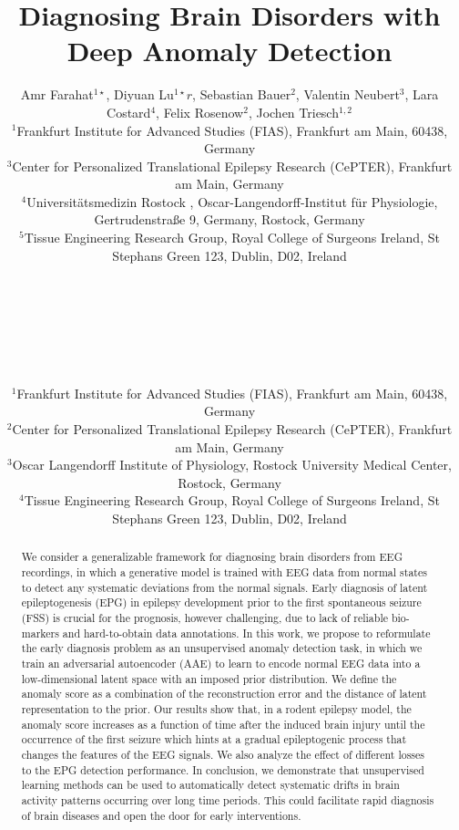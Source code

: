 \documentclass[pmlr]{jmlr}%
\title[Diagnosing Brain Disorders with Deep Anomaly Detection]{Diagnosing Brain Disorders with Deep Anomaly Detection}
\author{Amr Farahat$^{1 \star}$, Diyuan Lu$^{1 \star}r$, Sebastian Bauer$^{2}$, Valentin Neubert$^{3}$, Lara Costard$^{4}$, Felix Rosenow$^{2}$, Jochen Triesch$^{1, 2}$ \\
\small $^{1}$Frankfurt Institute for Advanced Studies (FIAS), Frankfurt am Main, 60438, Germany \\
\small $^{3}$Center for Personalized Translational Epilepsy Research (CePTER), Frankfurt am Main, Germany \\
\small $^{4}$Universitätsmedizin Rostock , Oscar-Langendorff-Institut für
Physiologie, Gertrudenstraße 9, Germany, Rostock, Germany\\
\small $^{5}$Tissue Engineering Research Group, Royal College of Surgeons Ireland, St Stephans Green 123, Dublin, D02, Ireland \\
}
\author{\Name{Amr Farahat$^{1}$}
\Email{farahat@fias.uni-frankfurt.de}\\ 
\AND
\Name{Diyuan Lu$^{1}$}
\Email{elu@fias.uni-frankfurt.de}\\ 
\AND
\Name{Sebastian Bauer$^{2}$}
\Email{Sebastian.Bauer@kgu.de}\\ 
\AND
\Name{Valentin Neubert$^{3}$}
\Email{valentin.neubert@uni-rostock.de}\\ 
\AND
\Name{Lara Sophie Costard$^{4}$}
\Email{laracostard@rcsi.com}\\ 
\AND
\Name{Felix Rosenow$^{2}$}
\Email{rosenow@med.uni-frankfurt.de}\\ 
\AND
\Name{Jochen Triesch$^{1, 2}$}
\Email{triesch@fias.uni-frankfurt.de}
\AND 
\small $^{1}$Frankfurt Institute for Advanced Studies (FIAS), Frankfurt am Main, 60438, Germany \\
\small $^{2}$Center for Personalized Translational Epilepsy Research (CePTER), Frankfurt am Main, Germany \\
\small $^{3}$Oscar Langendorff Institute of Physiology, Rostock University Medical Center, Rostock, Germany\\
\small $^{4}$Tissue Engineering Research Group, Royal College of Surgeons Ireland, St Stephans Green 123, Dublin, D02, Ireland \\
}
\begin{document}
\maketitle

\begin{abstract}
	We consider a generalizable framework for diagnosing brain disorders from EEG recordings, in which a generative model is trained with EEG data from normal states to detect any systematic deviations from the normal signals. Early diagnosis of latent epileptogenesis (EPG) in epilepsy development prior to the first spontaneous seizure (FSS) is crucial for the prognosis, however challenging, due to lack of reliable bio-markers and hard-to-obtain data annotations. In this work, we propose to reformulate the early diagnosis problem as an unsupervised anomaly detection task, in which we train an adversarial autoencoder (AAE) to learn to encode normal EEG data into a low-dimensional latent space with an imposed prior distribution. We define the anomaly score as a combination of the reconstruction error and the distance of latent representation to the prior. Our results show that, in a rodent epilepsy model, the anomaly score increases as a function of time after the induced brain injury until the occurrence of the first seizure which hints at a gradual epileptogenic process that changes the features of the EEG signals. We also analyze the effect of different losses to the EPG detection performance. In conclusion, we demonstrate that unsupervised learning methods can be used to automatically detect systematic drifts in brain activity patterns occurring over long time periods. This could facilitate rapid diagnosis of brain diseases and open the door for early interventions.
\end{abstract}

\end{document}
